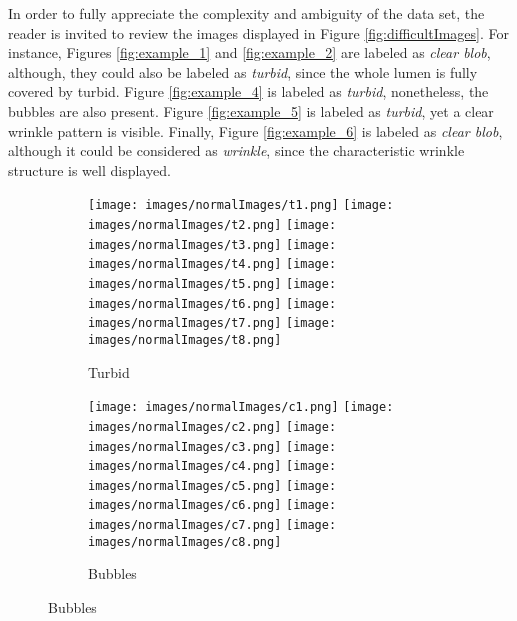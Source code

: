 \documentclass[review,12pt,3p]{elsarticle}
\begin{document}
In order to fully appreciate the complexity and ambiguity of the data set, the reader is invited to review the images displayed in Figure \ref{fig:difficultImages}. For instance, Figures \ref{fig:example_1} and \ref{fig:example_2} are labeled as \emph{clear blob}, although, they could  also be labeled as \emph{turbid}, since the whole lumen is fully covered by turbid. Figure \ref{fig:example_4} is labeled as \emph{turbid}, nonetheless, the bubbles are also present. Figure \ref{fig:example_5} is labeled as \emph{turbid}, yet a clear wrinkle pattern is visible. Finally, Figure \ref{fig:example_6} is labeled as \emph{clear blob}, although it could be considered as \emph{wrinkle}, since the characteristic wrinkle structure is well displayed.

\begin{figure}
        \centering

        \begin{subfigure}[b]{0.5\textwidth}
                \texttt{[image: images/normalImages/t1.png]}
                \texttt{[image: images/normalImages/t2.png]}
                \texttt{[image: images/normalImages/t3.png]}
                \texttt{[image: images/normalImages/t4.png]}
                \texttt{[image: images/normalImages/t5.png]}
                \texttt{[image: images/normalImages/t6.png]}
                \texttt{[image: images/normalImages/t7.png]}
                \texttt{[image: images/normalImages/t8.png]}
                \caption{Turbid}\label{fig:dataset_1}
        \end{subfigure}%

        \begin{subfigure}[b]{0.5\textwidth}
                \texttt{[image: images/normalImages/c1.png]}
                \texttt{[image: images/normalImages/c2.png]}
                \texttt{[image: images/normalImages/c3.png]}
                \texttt{[image: images/normalImages/c4.png]}
                \texttt{[image: images/normalImages/c5.png]}
                \texttt{[image: images/normalImages/c6.png]}
                \texttt{[image: images/normalImages/c7.png]}
                \texttt{[image: images/normalImages/c8.png]}
                \caption{Bubbles}\label{fig:dataset_2}
        \end{subfigure}%


\end{figure}
\end{document}
